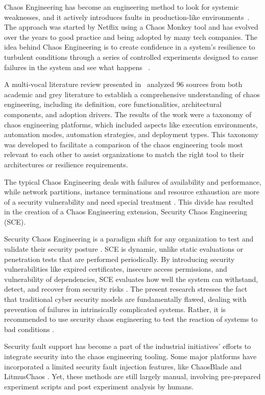\documentclass[conference,10pt]{IEEEtran}
\begin{document}
Chaos Engineering has become an engineering method to look for systemic weaknesses, and it actively introduces faults in production-like environments~\cite{basiri2016chaos}. The approach was started by Netflix using a Chaos Monkey tool and has evolved over the years to good practice and being adopted by many tech companies. The idea behind Chaos Engineering is to create confidence in a system's resilience to turbulent conditions through a series of controlled experiments designed to cause failures in the system and see what happens ~\cite{basiri2016chaos}.

A multi-vocal literature review presented in~\cite{owotogbe2025chaos} analyzed 96 sources from both academic and grey literature to establish a comprehensive understanding of chaos engineering, including its definition, core functionalities, architectural components, and adoption drivers. The results of the work were a taxonomy of chaos engineering platforms, which included aspects like execution environments, automation modes, automation strategies, and deployment types. This taxonomy was developed to facilitate a comparison of the chaos engineering tools most relevant to each other to assist organizations to match the right tool to their architectures or resilience requirements. 	

The typical Chaos Engineering deals with failures of availability and performance, while network partitions, instance terminations and resource exhaustion are more of a security vulnerability and need special treatment \cite{myrbakken2021security}. This divide has resulted in the creation of a Chaos Engineering extension, Security Chaos Engineering (SCE).

Security Chaos Engineering is a paradigm shift for any organization to test and validate their security posture \cite{shortridge2023security}. SCE is dynamic, unlike static evaluations or penetration tests that are performed periodically. By introducing security vulnerabilities like expired certificates, insecure access permissions, and vulnerability of dependencies, SCE evaluates how well the system can withstand, detect, and recover from security risks \cite{myrbakken2021security}. The present research stresses the fact that traditional cyber security models are fundamentally flawed, dealing with prevention of failures in intrinsically complicated systems. Rather, it is recommended to use security chaos engineering to test the reaction of systems to bad conditions \cite{shortridge2023security}.

Security fault support has become a part of the industrial initiatives' efforts to integrate security into the chaos engineering tooling. Some major platforms have incorporated a limited security fault injection features, like ChaosBlade and LitmusChaos \cite{chaosblade2021, litmus2022}. Yet, these methods are still largely manual, involving pre-prepared experiment scripts and post experiment analysis by humans.
\end{document}
